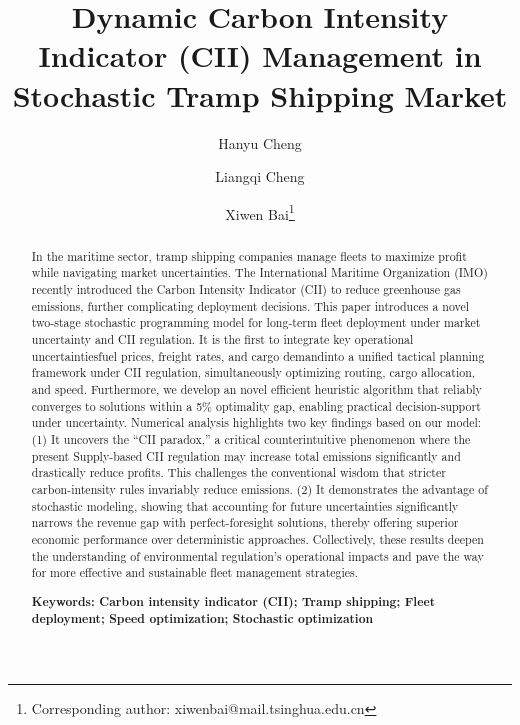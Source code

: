 \documentclass[11pt,english]{article}
\begin{document}
\title{Dynamic Carbon Intensity Indicator (CII) Management in Stochastic Tramp Shipping Market}
\author[a]{Hanyu Cheng}
\author[a]{Liangqi Cheng}
\author[a]{Xiwen Bai\thanks{Corresponding author: xiwenbai@mail.tsinghua.edu.cn}}
\date{}
\maketitle

\begin{abstract}
In the maritime sector, tramp shipping companies manage fleets to maximize profit while navigating market uncertainties. The International Maritime Organization (IMO) recently introduced the Carbon Intensity Indicator (CII) to reduce greenhouse gas emissions, further complicating deployment decisions. This paper introduces a novel two-stage stochastic programming model for long-term fleet deployment under market uncertainty and CII regulation. It is the first to integrate key operational uncertainties\textemdash fuel prices, freight rates, and cargo demand\textemdash into a unified tactical planning framework under CII regulation, simultaneously optimizing routing, cargo allocation, and speed. Furthermore, we develop an novel efficient heuristic algorithm that reliably converges to solutions within a 5\% optimality gap, enabling practical decision-support under uncertainty. Numerical analysis highlights two key findings based on our model: (1) It uncovers the ``CII paradox,'' a critical counterintuitive phenomenon where the present Supply-based CII regulation may increase total emissions significantly and drastically reduce profits. This challenges the conventional wisdom that stricter carbon-intensity rules invariably reduce emissions. (2) It demonstrates the advantage of stochastic modeling, showing that accounting for future uncertainties significantly narrows the revenue gap with perfect-foresight solutions, thereby offering superior economic performance over deterministic approaches. Collectively, these results deepen the understanding of environmental regulation's operational impacts and pave the way for more effective and sustainable fleet management strategies.

\bf Keywords: Carbon intensity indicator (CII); Tramp shipping; Fleet deployment; Speed optimization; Stochastic optimization
\end{abstract}

\newpage
\end{document}
